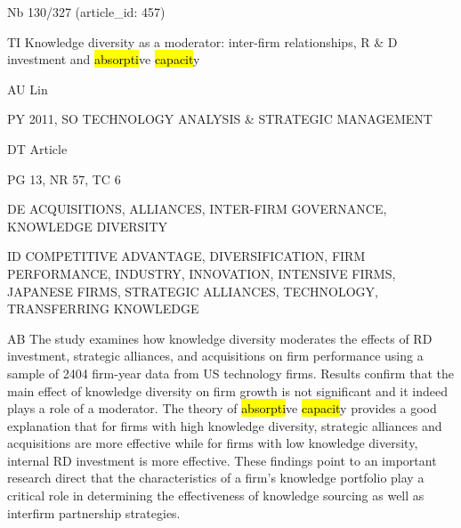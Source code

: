 \documentclass[a4paper]{article}
\begin{document}
\vspace*{-2cm}
Nb \tabto{0cm}130/327 (article\_id: 457)\par
TI \tabto{0cm}Knowledge diversity as a moderator: inter-firm relationships, R \& D investment and \hl{absorpti}ve \hl{capacit}y\par
AU \tabto{0cm}Lin\par
PY \tabto{0cm}2011, SO TECHNOLOGY ANALYSIS \& STRATEGIC MANAGEMENT\par
DT \tabto{0cm}Article\par
PG \tabto{0cm}13, NR 57, TC 6\par
DE \tabto{0cm}ACQUISITIONS, ALLIANCES, INTER-FIRM GOVERNANCE, KNOWLEDGE DIVERSITY\par
ID \tabto{0cm}COMPETITIVE ADVANTAGE, DIVERSIFICATION, FIRM PERFORMANCE, INDUSTRY, INNOVATION, INTENSIVE FIRMS, JAPANESE FIRMS, STRATEGIC ALLIANCES, TECHNOLOGY, TRANSFERRING KNOWLEDGE\par
AB \tabto{0cm}The study examines how knowledge diversity moderates the effects of RD investment, strategic alliances, and acquisitions on firm performance using a sample of 2404 firm-year data from US technology firms. Results confirm that the main effect of knowledge diversity on firm growth is not significant and it indeed plays a role of a moderator. The theory of \hl{absorpti}ve \hl{capacit}y provides a good explanation that for firms with high knowledge diversity, strategic alliances and acquisitions are more effective while for firms with low knowledge diversity, internal RD investment is more effective. These findings point to an important research direct that the characteristics of a firm's knowledge portfolio play a critical role in determining the effectiveness of knowledge sourcing as well as interfirm partnership strategies.\par
\clearpage
\end{document}
